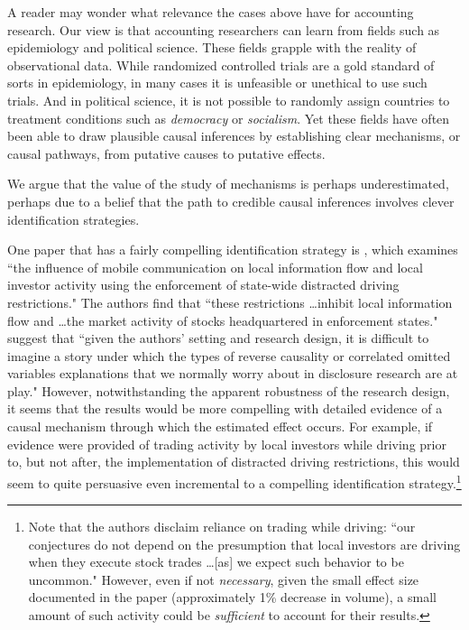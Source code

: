 \documentclass[11pt,reqno]{amsart}
\begin{document}
\begin{doublespace}
A reader may wonder what relevance the cases above have for accounting research.
Our view is that accounting researchers can learn from fields such as epidemiology and political science. 
These fields grapple with the reality of observational data.
While randomized controlled trials are a gold standard of sorts in epidemiology, in many cases it is unfeasible or unethical to use such trials.
And in political science, it is not possible to randomly assign countries to treatment conditions such as \emph{democracy} or \emph{socialism}.
Yet these fields have often been able to draw plausible causal inferences by establishing clear mechanisms, or causal pathways, from putative causes to putative effects.

We argue that the value of the study of mechanisms is perhaps underestimated, perhaps due to a belief that the path to credible causal inferences involves clever identification strategies.

One paper that has a fairly compelling identification strategy is \citet{Brown:2015ik}, which examines ``the influence of mobile communication on local information flow and local investor activity using the enforcement of state-wide distracted driving restrictions."
The authors find that ``these restrictions \dots inhibit local information flow and \dots the market activity of stocks headquartered in enforcement states."
\citet[p.\,9]{Miller:2015ec} suggest that ``given the authors' setting and research design, it is difficult to imagine a story under which the types of reverse causality or correlated omitted variables explanations that we normally worry about in disclosure research are at play."
However, notwithstanding the apparent robustness of the research design, it seems that the results would be more compelling with detailed evidence of a causal mechanism through which the estimated  effect occurs.
For example, if evidence were provided of trading activity by local investors while driving prior to, but not after, the implementation of distracted driving restrictions, this would seem to quite persuasive even incremental to a compelling identification strategy.\footnote{
Note that the authors disclaim reliance on trading while driving: ``our conjectures do not depend on the presumption that local investors are driving when they execute stock trades \dots [as] we expect such behavior to be uncommon."
However, even if not \emph{necessary}, given the small effect size documented in the paper (approximately 1\% decrease in volume), a small amount of such activity could be \emph{sufficient} to account for their results.}


\end{doublespace}
\end{document}
